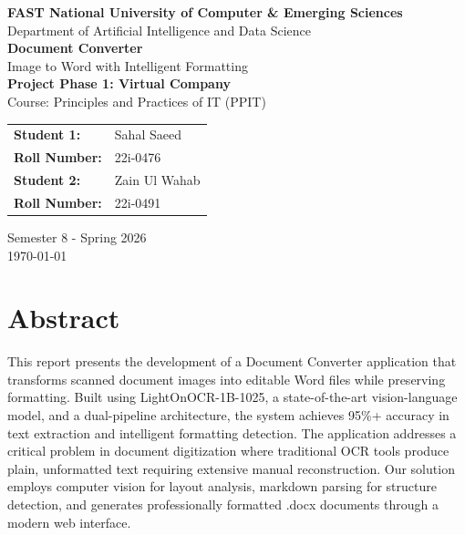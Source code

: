 \documentclass[12pt,a4paper]{article}
\begin{document}
\begin{titlepage}
    \centering
    \vspace*{2cm}
    
    {\LARGE\bfseries FAST National University of Computer \& Emerging Sciences}\\[0.5cm]
    {\large Department of Artificial Intelligence and Data Science}\\[3cm]
    
    {\Huge\bfseries Document Converter}\\[0.5cm]
    {\Large Image to Word with Intelligent Formatting}\\[2cm]
    
    {\large\bfseries Project Phase 1: Virtual Company}\\
    {\large Course: Principles and Practices of IT (PPIT)}\\[3cm]
    
    \begin{tabular}{l l}
        \textbf{Student 1:} & Sahal Saeed \\
        \textbf{Roll Number:} & 22i-0476 \\[0.5cm]
        \textbf{Student 2:} & Zain Ul Wahab \\
        \textbf{Roll Number:} & 22i-0491 \\
    \end{tabular}
    
    \vfill
    
    {\large Semester 8 - Spring 2026}\\
    {\large \today}
    
\end{titlepage}

\tableofcontents
\newpage

\section*{Abstract}

This report presents the development of a Document Converter application that transforms scanned document images into editable Word files while preserving formatting. Built using LightOnOCR-1B-1025, a state-of-the-art vision-language model, and a dual-pipeline architecture, the system achieves 95\%+ accuracy in text extraction and intelligent formatting detection. The application addresses a critical problem in document digitization where traditional OCR tools produce plain, unformatted text requiring extensive manual reconstruction. Our solution employs computer vision for layout analysis, markdown parsing for structure detection, and generates professionally formatted .docx documents through a modern web interface.
\end{document}
